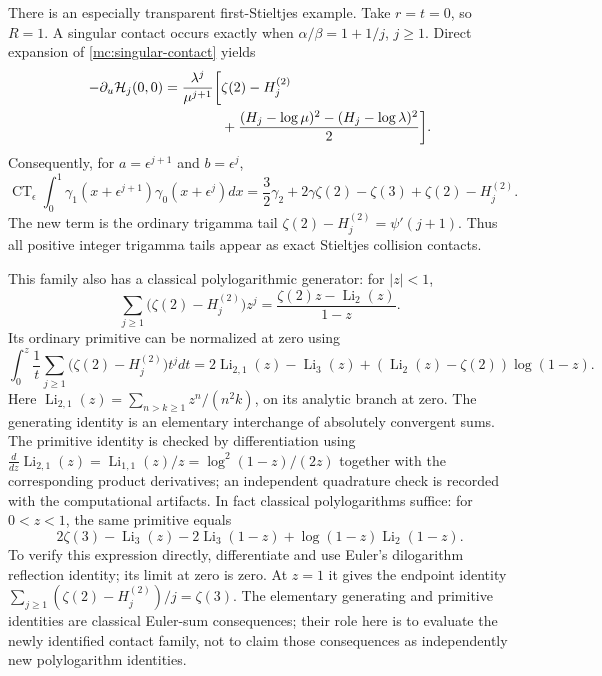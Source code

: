 There is an especially transparent first-Stieltjes example. Take
$r=t=0$, so $R=1$. A singular contact occurs exactly when
$\alpha/\beta=1+1/j$, $j\ge1$. Direct expansion of
\eqref{mc:singular-contact} yields
\begin{align}\label{mc:H10}
 -\partial_u\mathcal H_j(0,0)
 =\frac{\lambda^j}{\mu^{j+1}}\bigg[&\zeta(2)-H_j^{(2)}\notag\\
 &+\frac{(H_j-\log\mu)^2-(H_j-\log\lambda)^2}{2}\bigg].
\end{align}
Consequently, for $a=\epsilon^{j+1}$ and $b=\epsilon^j$,
\begin{equation}\label{mc:stieltjes-tail-contact}
 \boxed{\displaystyle
 \operatorname{CT}_{\epsilon}\int_0^1
          \gamma_1(x+\epsilon^{j+1})\gamma_0(x+\epsilon^j)dx
   =\frac32\gamma_2+2\gamma\zeta(2)-\zeta(3)
                         +\zeta(2)-H_j^{(2)}.}
\end{equation}
The new term is the ordinary trigamma tail
$\zeta(2)-H_j^{(2)}=\psi'(j+1)$.
Thus all positive integer trigamma tails appear as exact
Stieltjes collision contacts.

This family also has a classical polylogarithmic generator:
for $|z|<1$,
\begin{equation}\label{mc:polylog-generator}
 \sum_{j\ge1}\bigl(\zeta(2)-H_j^{(2)}\bigr)z^j
       =\frac{\zeta(2)z-\operatorname{Li}_2(z)}{1-z}.
\end{equation}
Its ordinary primitive can be normalized at zero using
\begin{equation}\label{mc:polylog-primitive}
 \int_0^z\frac1t
       \sum_{j\ge1}\bigl(\zeta(2)-H_j^{(2)}\bigr)t^jdt
   =2\operatorname{Li}_{2,1}(z)-\operatorname{Li}_3(z)
      +(\operatorname{Li}_2(z)-\zeta(2))\log(1-z).
\end{equation}
Here $\operatorname{Li}_{2,1}(z)=
\sum_{n>k\ge1}z^n/(n^2k)$, on its analytic branch at zero.
The generating identity is an elementary interchange of absolutely
convergent sums. The primitive identity is checked by differentiation
using $\frac{d}{dz}\operatorname{Li}_{2,1}(z)
=\operatorname{Li}_{1,1}(z)/z=\log^2(1-z)/(2z)$ together with
the corresponding product derivatives; an independent quadrature check
is recorded with the computational artifacts. In fact classical
polylogarithms suffice: for $0<z<1$, the same primitive equals
\begin{equation}\label{mc:classical-primitive}
 2\zeta(3)-\operatorname{Li}_3(z)-2\operatorname{Li}_3(1-z)
                +\log(1-z)\operatorname{Li}_2(1-z).
\end{equation}
To verify this expression directly, differentiate and use Euler's
dilogarithm reflection identity; its limit at zero is zero. At
$z=1$ it gives the endpoint identity
$\sum_{j\ge1}(\zeta(2)-H_j^{(2)})/j=\zeta(3)$.
The elementary generating and primitive identities are classical
Euler-sum consequences; their role here is to evaluate the newly
identified contact family, not to claim those consequences as
independently new polylogarithm identities.

